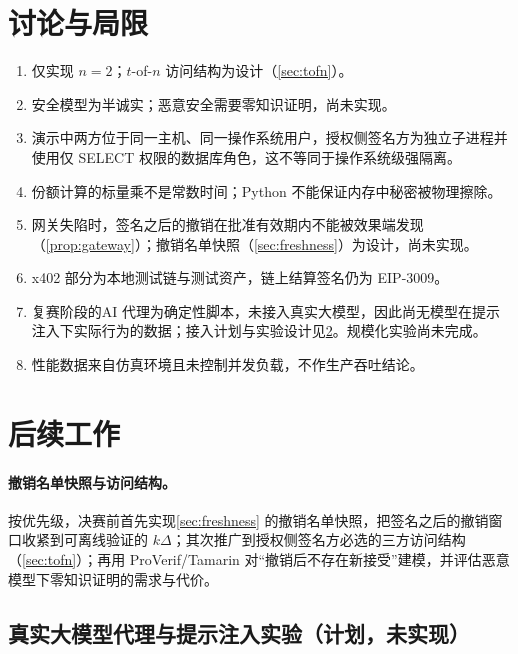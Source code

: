\documentclass[UTF8,zihao=-4,a4paper]{ctexart}
\newif\ifshowguide
\newcommand{\guide}[1]{%
  \ifshowguide
  \begin{tcolorbox}[colback=gray!8,colframe=gray!45,boxrule=0.4pt,
      arc=1pt,left=4pt,right=4pt,top=2pt,bottom=2pt,fontupper=\small]
  \textbf{写作指引：}#1
  \end{tcolorbox}
  \fi}
\theoremstyle{plain}
\theoremstyle{definition}
\theoremstyle{remark}
\begin{document}
\section{讨论与局限}\label{sec:limits}
\begin{enumerate}[leftmargin=2em,itemsep=1pt]
  \item 仅实现 $n=2$；$t$-of-$n$ 访问结构为设计（\cref{sec:tofn}）。
  \item 安全模型为半诚实；恶意安全需要零知识证明，尚未实现。
  \item 演示中两方位于同一主机、同一操作系统用户，授权侧签名方为独立子进程并使用仅 SELECT 权限的数据库角色，这不等同于操作系统级强隔离。
  \item 份额计算的标量乘不是常数时间；Python 不能保证内存中秘密被物理擦除。
  \item 网关失陷时，签名之后的撤销在批准有效期内不能被效果端发现（\cref{prop:gateway}）；撤销名单快照（\cref{sec:freshness}）为设计，尚未实现。
  \item x402 部分为本地测试链与测试资产，链上结算签名仍为 EIP-3009。
  \item 复赛阶段的AI 代理为确定性脚本，未接入真实大模型，因此尚无模型在提示注入下实际行为的数据；接入计划与实验设计见\cref{sec:future}。规模化实验尚未完成。
  \item 性能数据来自仿真环境且未控制并发负载，不作生产吞吐结论。
\end{enumerate}

\section{后续工作}\label{sec:future}
\guide{本节全部是计划，没有任何实测数字。实现并取得数据之前，不得把本节内容写进摘要、贡献列表或实验评估；数字出来后整段移入实验评估一节（\cref{sec:eval}），并注明运行编号、模型版本与样本数。}

\paragraph{撤销名单快照与访问结构。}按优先级，决赛前首先实现\cref{sec:freshness} 的撤销名单快照，把签名之后的撤销窗口收紧到可离线验证的 $k\Delta$；其次推广到授权侧签名方必选的三方访问结构（\cref{sec:tofn}）；再用 ProVerif/Tamarin 对“撤销后不存在新接受”建模，并评估恶意模型下零知识证明的需求与代价。

\subsection*{真实大模型代理与提示注入实验（计划，未实现）}
\end{document}
